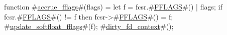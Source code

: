 function #\hyperref[sailRISCVzaccruezyfflags]{accrue\_fflags}#(flags) = {
  let f = fcsr.#\hyperref[sailRISCVzFFLAGS]{FFLAGS}#() | flags;
  if  fcsr.#\hyperref[sailRISCVzFFLAGS]{FFLAGS}#() != f
  then {
    fcsr->#\hyperref[sailRISCVzFFLAGS]{FFLAGS}#() = f;
    #\hyperref[sailRISCVzupdatezysoftfloatzyfflags]{update\_softfloat\_fflags}#(f);
    #\hyperref[sailRISCVzdirtyzyfdzycontext]{dirty\_fd\_context}#();
  }
}
